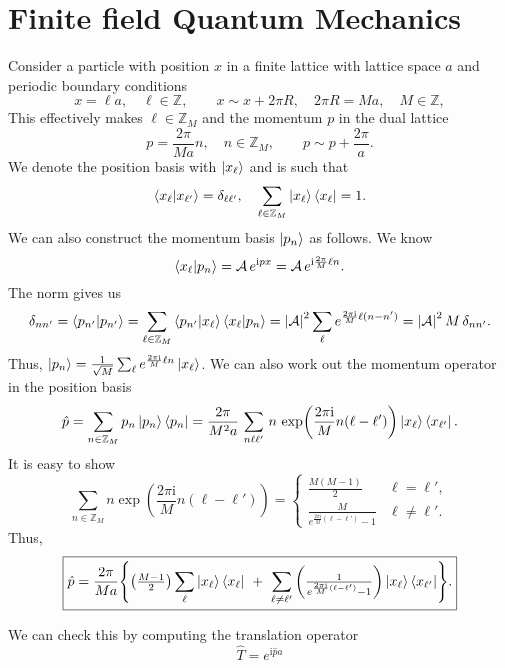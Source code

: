 \documentclass[10pt, a4paper]{article}
\newcommand{\ii}{\mathrm{i}}
\numberwithin{equation}{section}
\begin{document}
\section{Finite field Quantum Mechanics}
Consider a particle with position $x$ in a finite lattice with lattice space $a$ and periodic boundary conditions
\begin{equation}
  x = \ell a, \quad \ell \in \mathbb{Z}, \qquad x \sim x + 2 \pi R, \quad 2\pi R = M a, \quad M \in \mathbb{Z},
\end{equation}
This effectively makes $\ell \in \mathbb{Z}_M$ and the momentum $p$ in the dual lattice
\begin{equation}
  p = \frac{2 \pi}{M a} n, \quad n \in \mathbb{Z}_M, \qquad p \sim p + \frac{2 \pi}{a}.
\end{equation}
We denote the position basis with $\ket{x_\ell}$ and is such that
\begin{equation}
  \bra{x_\ell}\ket{x_{\ell'}} = \delta_{\ell \ell'}, \quad \sum_{\ell \in \mathbb{Z}_M} \ket{x_\ell}\bra{x_\ell} = 1.
\end{equation}
We can also construct the momentum basis $\ket{p_n}$ as follows. We know
\begin{equation}
  \bra{x_\ell}\ket{p_n} = \mathcal{A} \, e^{\ii p x} = \mathcal{A} \, e^{\ii \frac{2 \pi}{M} \ell n}.
\end{equation}
The norm gives us
\begin{equation}
  \delta_{n n'} = \bra{p_{n'}} \ket{p_{n'}} = \sum_{\ell \in \mathbb{Z}_M} \bra{p_{n'}}\ket{x_\ell} \bra{x_\ell}\ket{p_n} = \abs{\mathcal{A}}^2 \sum_{\ell} e^{\frac{2\pi \ii}{M} \ell (n - n')} = \abs{\mathcal{A}}^2 \, M \, \delta_{n n'}.
\end{equation}
Thus, $\ket{p_n} = \frac{1}{\sqrt{M}} \sum_{\ell} e^{\frac{2\pi\ii}{M} \ell n} \ket{x_\ell}$. We can also work out the momentum operator in the position basis
\begin{equation}
  \hat{p} = \sum_{n \in \mathbb{Z}_M} p_n \ket{p_n} \bra{p_n} = \frac{2 \pi}{M^2 a} \, \sum_{n \ell \ell'} \, n  \, \exp(\frac{2 \pi \ii}{M} n (\ell - \ell')) \ket{x_\ell} \bra{x_{\ell'}}.
\end{equation}
It is easy to show
\begin{equation}
  \sum_{n \in \mathbb{Z}_M} n \exp(\frac{2 \pi \ii}{M} n (\ell - \ell')) = \begin{cases}
    \frac{M (M-1)}{2} & \ell = \ell', \\
    \frac{M}{e^{\frac{2\pi\ii}{M} (\ell - \ell')} - 1} & \ell \neq \ell'.
  \end{cases}
\end{equation}
Thus,
\begin{equation}
  \boxed{
  \hat{p} = \frac{2 \pi}{M a} \Biggl\{ \qty(\tfrac{M-1}{2}) \sum_{\ell} \ket{x_\ell} \bra{x_\ell} \ + \ \sum_{\ell \neq \ell'} \qty(\tfrac{1}{e^{\frac{2\pi\ii}{M} (\ell - \ell')} - 1}) \ket{x_\ell} \bra{x_{\ell'}} \Biggr\}.
  }
\end{equation}

We can check this by computing the translation operator
\begin{equation}
  \hat{T} = e^{\ii \hat{p} a}
\end{equation}


\printbibliography
\end{document}
